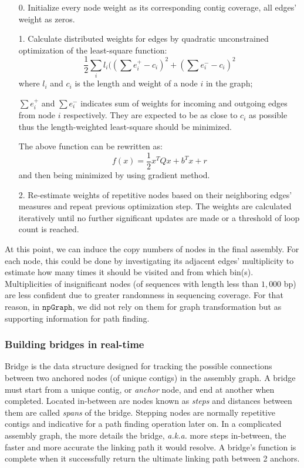 \documentclass[10pt,letterpaper]{article}
\newcommand{\npgraph}{$\mathtt{npGraph}$}
\begin{document}
\begin{itemize}
\item[0.] Initialize every node weight as its corresponding contig coverage, all edges' weight as zeros.
\item[1.] Calculate distributed weights for edges by quadratic unconstrained optimization of the least-square function:
$$\frac{1}{2}\sum_{i}{l_i((\sum{e^{+}_{i}}-c_i)^2+(\sum{e^{-}_{i}}-c_i)^2}$$
where $l_i$ and $c_i$ is the length and weight of a node $i$ in the graph;

$\sum{e^{+}_{i}}$ and $\sum{e^{-}_{i}}$ indicates sum of weights for incoming and outgoing edges from node $i$ respectively. They are expected to be as close to $c_i$ as possible thus the length-weighted least-square should be minimized. 

The above function can be rewritten as:
$$f(x)=\frac{1}{2}x^TQx + b^Tx + r$$
and then being minimized by using gradient method.
\item[2.] Re-estimate weights of repetitive nodes based on their neighboring edges' measures and repeat previous optimization step. 
The weights are calculated iteratively until no further significant updates are made or a threshold of loop count is reached.
\end{itemize}

At this point, we can induce the copy numbers of nodes in the final assembly.
For each node, this could be done by investigating its adjacent edges' multiplicity to estimate how many times it should be visited and from which bin(s).
Multiplicities of insignificant nodes (of sequences with length less than $1,000$ bp) are less confident due to greater randomness in sequencing coverage. 
For that reason, in \npgraph{}, we did not rely on them for graph transformation but as supporting information for path finding.

\subsubsection*{Building bridges in real-time}
Bridge is the data structure designed for tracking the possible connections between two anchored nodes (of unique contigs) in the assembly graph.
A bridge must start from a unique contig, or \emph{anchor} node, and end at another when completed. Located in-between are nodes known as \emph{steps} and distances between them are called \emph{spans} of the bridge. Stepping nodes are normally repetitive contigs and indicative for a path finding operation later on. In a complicated assembly graph, the more details the bridge, \emph{a.k.a.} more steps in-between, the faster and more accurate the linking path it would resolve. A bridge's function is complete when it successfully return the ultimate linking path between 2 anchors.
\end{document}
